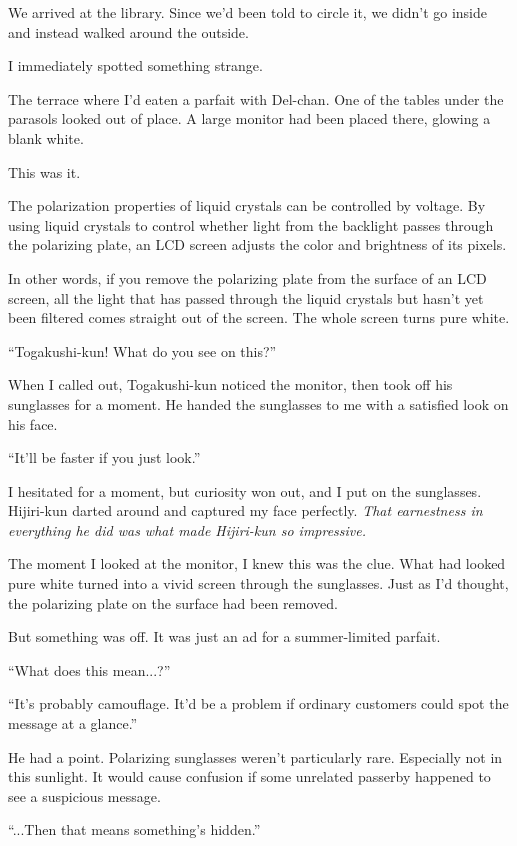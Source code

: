 \documentclass[
    a4paper,
    12pt,
    twoside,
    openany,
    UTF8,
    fontset=windows
]{ctexbook}
\begin{document}
We arrived at the library. Since we'd been told to circle it, we didn't go inside and instead walked around the outside.

I immediately spotted something strange.

The terrace where I'd eaten a parfait with Del-chan. One of the tables under the parasols looked out of place. A large monitor had been placed there, glowing a blank white.

This was it.

The polarization properties of liquid crystals can be controlled by voltage. By using liquid crystals to control whether light from the backlight passes through the polarizing plate, an LCD screen adjusts the color and brightness of its pixels.

In other words, if you remove the polarizing plate from the surface of an LCD screen, all the light that has passed through the liquid crystals but hasn't yet been filtered comes straight out of the screen. The whole screen turns pure white.

``Togakushi-kun! What do you see on this?''

When I called out, Togakushi-kun noticed the monitor, then took off his sunglasses for a moment. He handed the sunglasses to me with a satisfied look on his face.

``It'll be faster if you just look.''

I hesitated for a moment, but curiosity won out, and I put on the sunglasses. Hijiri-kun darted around and captured my face perfectly. \textit{That earnestness in everything he did was what made Hijiri-kun so impressive.}

The moment I looked at the monitor, I knew this was the clue. What had looked pure white turned into a vivid screen through the sunglasses. Just as I'd thought, the polarizing plate on the surface had been removed.

But something was off. It was just an ad for a summer-limited parfait.

``What does this mean...?''

``It's probably camouflage. It'd be a problem if ordinary customers could spot the message at a glance.''

He had a point. Polarizing sunglasses weren't particularly rare. Especially not in this sunlight. It would cause confusion if some unrelated passerby happened to see a suspicious message.

``...Then that means something's hidden.''
\end{document}
